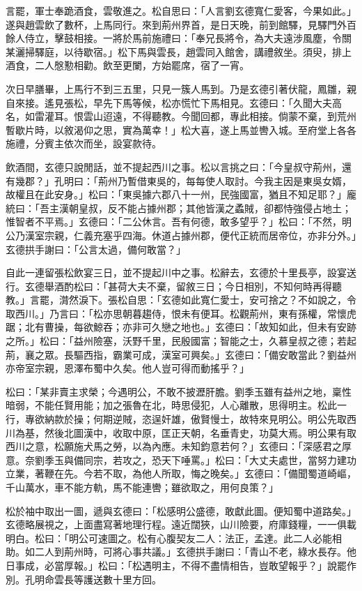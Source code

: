 言罷，軍士奉跪酒食，雲敬進之。松自思曰：「人言劉玄德寬仁愛客，今果如此。」遂與趙雲飲了數杯，上馬同行。來到荊州界首，是日天晚，前到館驛，見驛門外百餘人侍立，擊鼓相接。一將於馬前施禮曰：「奉兄長將令，為大夫遠涉風塵，令關某灑掃驛庭，以待歇宿。」松下馬與雲長，趙雲同入館舍，講禮敘坐。須臾，排上酒食，二人慇懃相勸。飲至更闌，方始罷席，宿了一宵。

次日早膳畢，上馬行不到三五里，只見一簇人馬到。乃是玄德引著伏龍，鳳雛，親自來接。遙見張松，早先下馬等候，松亦慌忙下馬相見。玄德曰：「久聞大夫高名，如雷灌耳。恨雲山迢遠，不得聽教。今聞回都，專此相接。倘蒙不棄，到荒州暫歇片時，以敘渴仰之思，實為萬幸！」松大喜，遂上馬並轡入城。至府堂上各各施禮，分賓主依次而坐，設宴款待。

飲酒間，玄德只說閒話，並不提起西川之事。松以言挑之曰：「今皇叔守荊州，還有幾郡？」孔明曰：「荊州乃暫借東吳的，每每使人取討。今我主因是東吳女婿，故權且在此安身。」松曰：「東吳據六郡八十一州，民強國富，猶且不知足耶？」龐統曰：「吾主漢朝皇叔，反不能占據州郡；其他皆漢之蟊賊，卻都恃強侵占地土；惟智者不平焉。」玄德曰：「二公休言。吾有何德，敢多望乎？」松曰：「不然，明公乃漢室宗親，仁義充塞乎四海。休道占據州郡，便代正統而居帝位，亦非分外。」玄德拱手謝曰：「公言太過，備何敢當？」

自此一連留張松飲宴三日，並不提起川中之事。松辭去，玄德於十里長亭，設宴送行。玄德舉酒酌松曰：「甚荷大夫不棄，留敘三日；今日相別，不知何時再得聽教。」言罷，潸然淚下。張松自思：「玄德如此寬仁愛士，安可捨之？不如說之，令取西川。」乃言曰：「松亦思朝暮趨侍，恨未有便耳。松觀荊州，東有孫權，常懷虎踞；北有曹操，每欲鯨吞；亦非可久戀之地也。」玄德曰：「故知如此，但未有安跡之所。」松曰：「益州險塞，沃野千里，民殷國富；智能之士，久慕皇叔之德；若起荊，襄之眾。長驅西指，霸業可成，漢室可興矣。」玄德曰：「備安敢當此？劉益州亦帝室宗親，恩澤布蜀中久矣。他人豈可得而動搖乎？」

松曰：「某非賣主求榮；今遇明公，不敢不披瀝肝膽。劉季玉雖有益州之地，稟性暗弱，不能任賢用能；加之張魯在北，時思侵犯，人心離散，思得明主。松此一行，專欲納款於操；何期逆賊，恣逞奸雄，傲賢慢士，故特來見明公。明公先取西川為基，然後北圖漢中，收取中原，匡正天朝，名垂青史，功莫大焉。明公果有取西川之意，松願施犬馬之勞，以為內應。未知鈞意若何？」玄德曰：「深感君之厚意。奈劉季玉與備同宗，若攻之，恐天下唾罵。」松曰：「大丈夫處世，當努力建功立業，著鞭在先。今若不取，為他人所取，悔之晚矣。」玄德曰：「備聞蜀道崎嶇，千山萬水，車不能方軌，馬不能連轡；雖欲取之，用何良策？」

松於袖中取出一圖，遞與玄德曰：「松感明公盛德，敢獻此圖。便知蜀中道路矣。」玄德略展視之，上面盡寫著地理行程。遠近闊狹，山川險要，府庫錢糧，一一俱載明白。松曰：「明公可速圖之。松有心腹契友二人：法正，孟達。此二人必能相助。如二人到荊州時，可將心事共議。」玄德拱手謝曰：「青山不老，綠水長存。他日事成，必當厚報。」松曰：「松遇明主，不得不盡情相告，豈敢望報乎？」說罷作別。孔明命雲長等護送數十里方回。

